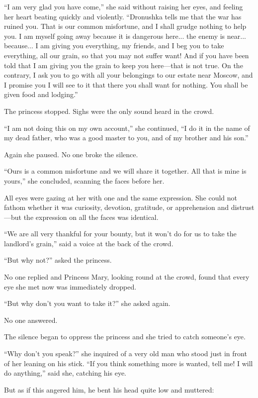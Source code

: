 ``I am very glad you have come,'' she said without raising her
eyes, and feeling her heart beating quickly and
violently. ``Dronushka tells me that the war has ruined you. That
is our common misfortune, and I shall grudge nothing to help
you. I am myself going away because it is dangerous here... the
enemy is near... because... I am giving you everything, my
friends, and I beg you to take everything, all our grain, so that
you may not suffer want! And if you have been told that I am
giving you the grain to keep you here---that is not true. On the
contrary, I ask you to go with all your belongings to our estate
near Moscow, and I promise you I will see to it that there you
shall want for nothing. You shall be given food and lodging.''

The princess stopped. Sighs were the only sound heard in the
crowd.

``I am not doing this on my own account,'' she continued, ``I do
it in the name of my dead father, who was a good master to you,
and of my brother and his son.''

Again she paused. No one broke the silence.

``Ours is a common misfortune and we will share it together. All
that is mine is yours,'' she concluded, scanning the faces before
her.

All eyes were gazing at her with one and the same expression. She
could not fathom whether it was curiosity, devotion, gratitude,
or apprehension and distrust---but the expression on all the
faces was identical.

``We are all very thankful for your bounty, but it won't do for
us to take the landlord's grain,'' said a voice at the back of
the crowd.

``But why not?'' asked the princess.

No one replied and Princess Mary, looking round at the crowd,
found that every eye she met now was immediately dropped.

``But why don't you want to take it?'' she asked again.

No one answered.

The silence began to oppress the princess and she tried to catch
someone's eye.

``Why don't you speak?'' she inquired of a very old man who stood
just in front of her leaning on his stick. ``If you think
something more is wanted, tell me! I will do anything,'' said
she, catching his eye.

But as if this angered him, he bent his head quite low and
muttered:

